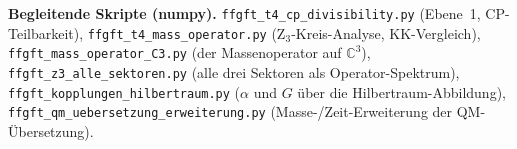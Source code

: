 \bigskip
\noindent\textbf{Begleitende Skripte (numpy).}
\texttt{ffgft\_t4\_cp\_divisibility.py} (Ebene~1, CP-Teilbarkeit),
\texttt{ffgft\_t4\_mass\_operator.py} (Z$_3$-Kreis-Analyse, KK-Vergleich),
\texttt{ffgft\_mass\_operator\_C3.py} (der Massenoperator auf $\mathbb{C}^3$),
\texttt{ffgft\_z3\_alle\_sektoren.py} (alle drei Sektoren als Operator-Spektrum),
\texttt{ffgft\_kopplungen\_hilbertraum.py} ($\alpha$ und $G$ über die
Hilbertraum-Abbildung),
\texttt{ffgft\_qm\_uebersetzung\_erweiterung.py} (Masse-/Zeit-Erweiterung der
QM-Übersetzung).
